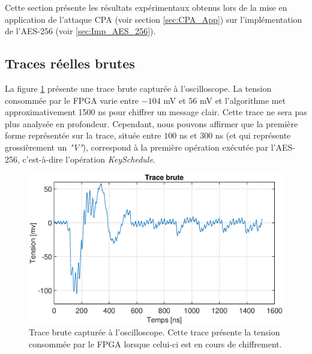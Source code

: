 \documentclass[oneside]{book}
\begin{document}
Cette section présente les résultats expérimentaux obtenus lors de la mise en application de l'attaque CPA (voir section \ref{sec:CPA_App}) sur l'implémentation de l'AES-256 (voir \ref{sec:Imp_AES_256}).

\subsection{Traces réelles brutes}
\label{sec:real_trace}

La figure \ref{fig:trace_brute} présente une trace brute capturée à l'oscilloscope. La tension consommée par le FPGA varie entre $-104$ \si{\milli\volt} et $56$ \si{\milli\volt} et l'algorithme met approximativement 1500 \si{\nano\second} pour chiffrer un message clair. Cette trace ne sera pas plus analysée en profondeur. Cependant, nous pouvons affirmer que la première forme représentée sur la trace, située entre $100$ \si{\nano\second} et $300$ \si{\nano\second} (et qui représente grossièrement un \textit{"V"}),  correspond à la première opération exécutée par l'AES-256, c'est-à-dire l'opération \textit{KeySchedule}.

\begin{figure}[htbp]
    \hspace{-2cm}
    \includegraphics[scale=0.6]{image/trace_brute}
    \caption{Trace brute capturée à l'oscilloscope. Cette trace présente la tension consommée par le FPGA lorsque celui-ci est en cours de chiffrement.}
    \label{fig:trace_brute} 
\end{figure}
\end{document}
